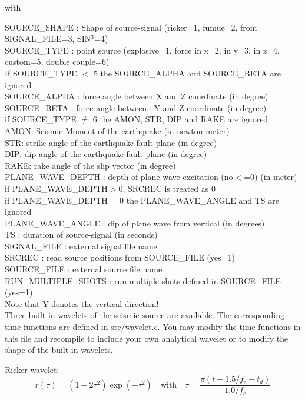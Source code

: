 \documentclass[11pt,onecolumn,oneside]{article}
\begin{document}
with

SOURCE\_SHAPE : Shape of source-signal (ricker=1, fumue=2, from SIGNAL\_FILE=3, SIN$^3$=4) \\
SOURCE\_TYPE : point source (explosive=1, force in x=2, in y=3, in z=4, custom=5, double couple=6) \\
If SOURCE\_TYPE $<$ 5 the SOURCE\_ALPHA and SOURCE\_BETA are ignored \\
SOURCE\_ALPHA : force angle between X and Z coordinate (in degree)\\
SOURCE\_BETA : force angle between:: Y and Z coordinate (in degree)\\
if SOURCE\_TYPE $\ne$ 6 the AMON, STR, DIP and RAKE are ignored\\
AMON: Seismic Moment of the earthquake (in newton meter)\\
STR: strike angle of the earthquake fault plane (in degree)\\
DIP: dip angle of the earthquake fault plane (in degree)\\
RAKE: rake angle of the slip vector (in degree)\\
PLANE\_WAVE\_DEPTH : depth of plane wave excitation (no$<$=0) (in meter)\\
if PLANE\_WAVE\_DEPTH$>$0, SRCREC is treated as 0\\
if PLANE\_WAVE\_DEPTH = 0 the PLANE\_WAVE\_ANGLE and TS  are ignored\\
PLANE\_WAVE\_ANGLE : dip of plane wave from vertical (in degrees)\\
TS : duration of source-signal (in seconds)\\
SIGNAL\_FILE : external signal file name \\
SRCREC : read source positions from SOURCE\_FILE (yes=1)\\
SOURCE\_FILE : external source file name \\
RUN\_MULTIPLE\_SHOTS : run multiple shots defined in SOURCE\_FILE (yes=1)\\
Note that Y denotes the vertical direction!\\

Three built-in wavelets of the seismic source are available. The corresponding time functions are defined in src/wavelet.c. You may modify the time functions in this file and recompile to include your
own analytical wavelet or to modify the shape of the built-in wavelets.

Ricker wavelet:
\begin{equation}
r(\tau)=\left(1-2\tau^2\right)\exp(-\tau^2) \quad \mbox{with} \quad \tau=\frac{\pi(t-1.5/f_c-t_d)}{1.0/f_c}
\label{eq_ricker}
\end{equation}
\end{document}
